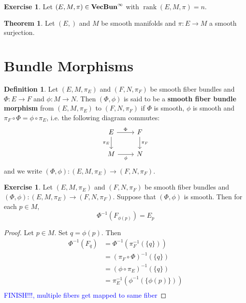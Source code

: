 \documentclass{book}
\theoremstyle{definition}
\newtheorem{defn}[definition]{Definition}
\newtheorem{thm}[definition]{Theorem}
\newtheorem{ex}[definition]{Exercise}
\DeclareMathOperator{\rnk}{rank}
\DeclareMathOperator*{\VecBuninf}{\text{\tbf{VecBun}}^{\infty}}
\DeclareMathOperator*{\0}{\mbf{0}}
\DeclareMathOperator*{\1}{\mbf{1}}
\newcommand{\tbf}[1]{\textbf{#1}}
\newcommand{\tcb}[1]{\textcolor{blue}{#1}}
\begin{document}
\begin{ex}
	Let $(E, M, \pi) \in \VecBuninf$ with $\rnk (E, M, \pi) = n$. 
\end{ex}

\begin{thm}
	Let $(E,)$ and $M$ be smooth manifolds and $\pi: E \rightarrow M$ a smooth surjection.
\end{thm}
	
	
	
	
	
	
	
	
	
	
	
	
	
	
	
	
	
	
	
	
	
	
	
	\newpage
	\section{Bundle Morphisms}
	
	\begin{defn}
		Let $(E, M, \pi_E)$ and $(F, N, \pi_F)$ be smooth fiber bundles and $\Phi: E \rightarrow F$ and $\phi: M \rightarrow N$. Then $(\Phi, \phi)$ is said to be a \tbf{smooth fiber bundle morphism} from $(E, M, \pi_E)$ to $(F, N, \pi_F)$ if $\Phi$ is smooth, $\phi$ is smooth and $\pi_F \circ \Phi = \phi \circ \pi_E$, 
		i.e. the following diagram commutes:
		\[ 
		\begin{tikzcd}
			E \arrow[r, "\Phi"] \arrow[d, "\pi_E"'] & F  \arrow[d, "\pi_F"] \\
			M \arrow[r, "\phi"']                  & N
		\end{tikzcd}
		\] 
		and we write $(\Phi, \phi): (E, M, \pi_E) \rightarrow (F, N, \pi_F)$.
	\end{defn}
	
	\begin{ex}
		Let $(E, M, \pi_E)$ and $(F, N, \pi_F)$ be smooth fiber bundles and $(\Phi, \phi): (E, M, \pi_E) \rightarrow (F, N, \pi_F)$. Suppose that $(\Phi, \phi)$ is smooth. Then for each $p \in M$, 
		$$\Phi^{-1}(F_{\phi(p)}) = E_{p}$$
	\end{ex}

	\begin{proof}
		Let $p \in M$. Set $q = \phi(p)$. Then 
		\begin{align*}
			\Phi^{-1}(F_{q})
			& = \Phi^{-1}(\pi_F^{-1}(\{q\})) \\
			& = (\pi_F \circ \Phi)^{-1}(\{q\}) \\
			& = (\phi \circ \pi_E)^{-1} (\{q\}) \\
			& = \pi_E^{-1} ( \phi^{-1}( \{\phi(p)\})) \\
		\end{align*}
	\tcb{FINISH!!!, multiple fibers get mapped to same fiber}
	\end{proof}
	
\end{document}
